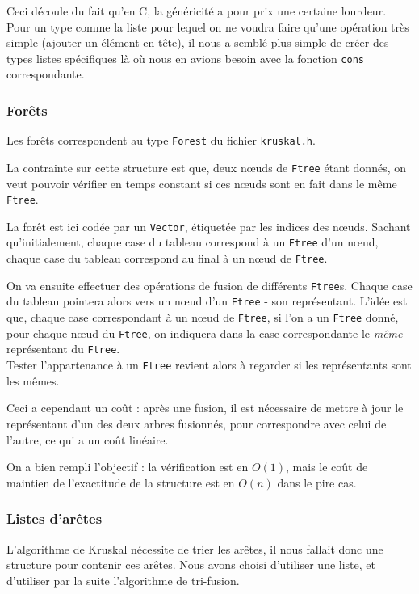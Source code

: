 \documentclass[a4paper]{article}
\begin{document}
Ceci découle du fait qu'en C, la généricité a pour prix une certaine lourdeur. Pour un type comme la liste pour lequel on ne voudra faire qu'une opération très simple (ajouter un élément en tête), il nous a semblé plus simple de créer des types listes spécifiques là où nous en avions besoin avec la fonction \texttt{cons} correspondante.

\subsubsection{Forêts}

Les forêts correspondent au type \texttt{Forest} du fichier \texttt{kruskal.h}.

La contrainte sur cette structure est que, deux nœuds de \texttt{Ftree} étant donnés, on veut pouvoir vérifier en temps constant si ces nœuds sont en fait dans le même \texttt{Ftree}.

La forêt est ici codée par un \texttt{Vector}, étiquetée par les indices des nœuds. Sachant qu'initialement, chaque case du tableau correspond à un \texttt{Ftree} d'un nœud, chaque case du tableau correspond au final à un nœud de \texttt{Ftree}.

On va ensuite effectuer des opérations de fusion de différents \texttt{Ftree}s. Chaque case du tableau pointera alors vers un nœud d'un \texttt{Ftree} - son représentant. L'idée est que, chaque case correspondant à un nœud de \texttt{Ftree}, si l'on a un \texttt{Ftree} donné, pour chaque nœud du \texttt{Ftree}, on indiquera dans la case correspondante le \textit{même} représentant du \texttt{Ftree}.\\
Tester l'appartenance à un \texttt{Ftree} revient alors à regarder si les représentants sont les mêmes.

Ceci a cependant un coût : après une fusion, il est nécessaire de mettre à jour le représentant d'un des deux arbres fusionnés, pour correspondre avec celui de l'autre, ce qui a un coût linéaire.

On a bien rempli l'objectif : la vérification est en $O(1)$, mais le coût de maintien de l'exactitude de la structure est en $O(n)$ dans le pire cas.

\subsubsection{Listes d'arêtes}

L'algorithme de {\sc Kruskal} nécessite de trier les arêtes, il nous fallait donc une structure pour contenir ces arêtes. Nous avons choisi d'utiliser une liste, et d'utiliser par la suite l'algorithme de tri-fusion.
\end{document}

